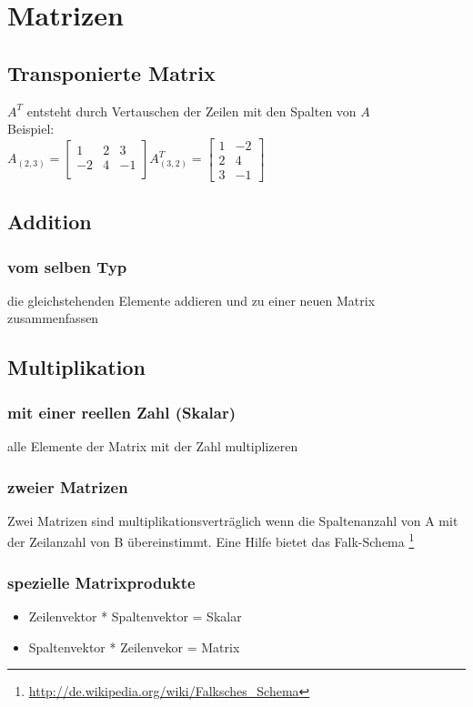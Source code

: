 \documentclass[a4paper,12pt]{scrartcl}
\begin{document}
\newpage
\section{Matrizen}
\subsection{Transponierte Matrix}
$A^T$ entsteht durch Vertauschen der Zeilen mit den Spalten von $A$\\

Beispiel: \\
$A_{(2,3)} = 
\begin{bmatrix}
 1 & 2 & 3\\
 -2 & 4 & -1 \\
\end{bmatrix}
A_{(3,2)}^T = 
\begin{bmatrix}
 1 & -2\\
 2 & 4\\
 3 & -1
\end{bmatrix}
$
\subsection{Addition}
\subsubsection{vom selben Typ}
die gleichstehenden Elemente addieren und zu einer neuen Matrix zusammenfassen

\subsection{Multiplikation}
\subsubsection{mit einer reellen Zahl (Skalar)}
alle Elemente der Matrix mit der Zahl multiplizeren

\subsubsection{zweier Matrizen}
Zwei Matrizen sind multiplikationsverträglich wenn die Spaltenanzahl von A mit der Zeilanzahl von B übereinstimmt. 
Eine Hilfe bietet das Falk-Schema \footnote{\url{http://de.wikipedia.org/wiki/Falksches_Schema}}

\subsubsection{spezielle Matrixprodukte}
\begin{itemize}
\item Zeilenvektor * Spaltenvektor = Skalar
\item Spaltenvektor * Zeilenvekor = Matrix
\end{itemize}
\end{document}
